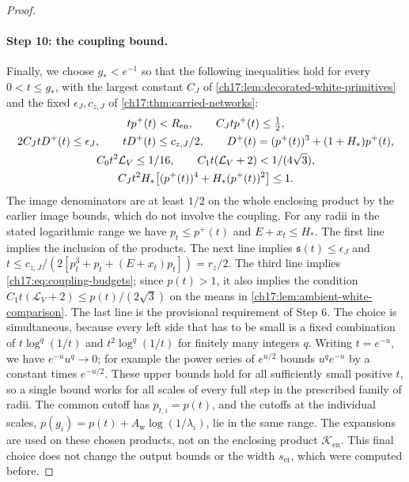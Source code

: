 \begin{proof}
\paragraph{Step 10: the coupling bound.}
Finally, we choose $g_*<e^{-1}$ so that the following inequalities hold for every $0<t\le g_*$, with the largest constant $C_J$ of \cref{ch17:lem:decorated-white-primitives} and the fixed $\epsilon_J,c_{z,J}$ of \cref{ch17:thm:carried-networks}:
\begin{equation}\label{ch17:eq:uniform-logarithmic-gates}
\begin{gathered}
 tp^+(t)<R_{\mathrm{en}},\qquad C_Jtp^+(t)\le\tfrac12,\\
 2C_JtD^+(t)\le\epsilon_J,\qquad tD^+(t)\le c_{z,J}/2,\qquad D^+(t)=(p^+(t))^3+(1+H_*)p^+(t),\\
 C_0t^2\mathcal L_V\le1/16,\qquad C_1t(\mathcal L_V+2)<1/(4\sqrt3),\\
 C_Jt^2H_*\bigl[(p^+(t))^4+H_*(p^+(t))^2\bigr]\le1.
\end{gathered}
\end{equation}
The image denominators are at least $1/2$ on the whole enclosing product by the earlier image bounds, which do not involve the coupling. For any radii in the stated logarithmic range we have $p_t\le p^+(t)$ and $E+x_t\le H_*$. The first line implies the inclusion of the products. The next line implies $\mathfrak s(t)\le\epsilon_J$ and $t\le c_{z,J}/(2[p_t^3+p_t+(E+x_t)p_t])=r_z/2$. The third line implies \eqref{ch17:eq:coupling-budgets}; since $p(t)>1$, it also implies the condition $C_1t(\mathcal L_V+2)\le p(t)/(2\sqrt3)$ on the means in \cref{ch17:lem:ambient-white-comparison}. The last line is the provisional requirement of Step 6. The choice is simultaneous, because every left side that has to be small is a fixed combination of $t\log^q(1/t)$ and $t^2\log^q(1/t)$ for finitely many integers $q$. Writing $t=e^{-u}$, we have $e^{-u}u^q\to0$; for example the power series of $e^{u/2}$ bounds $u^qe^{-u}$ by a constant times $e^{-u/2}$. These upper bounds hold for all sufficiently small positive $t$, so a single bound works for all scales of every full step in the prescribed family of radii. The common cutoff has $p_{t,i}=p(t)$, and the cutoffs at the individual scales, $p(g_i)=p(t)+A_{\mathrm w}\log(1/\lambda_i)$, lie in the same range. The expansions are used on these chosen products, not on the enclosing product $\mathcal K_{\mathrm{en}}$. This final choice does not change the output bounds or the width $s_{\mathrm{er}}$, which were computed before.


\end{proof}
